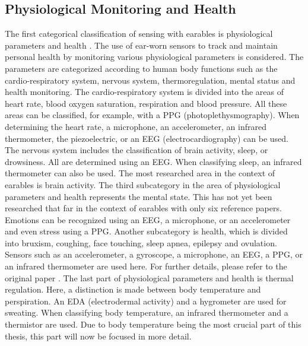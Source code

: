 \subsection{Physiological Monitoring and Health}
\label{Background:SensingWithEarables:Physiological}
The first categorical classification of sensing with earables is physiological parameters and health \cite{roddigerSensingEarablesSystematic2022a}.
The use of ear-worn sensors to track and maintain personal health by monitoring various physiological parameters is considered.
The parameters are categorized according to human body functions such as the cardio-respiratory system, nervous system, thermoregulation, mental status and health monitoring.
The cardio-respiratory system is divided into the areas of heart rate, blood oxygen saturation, respiration and blood pressure.
All these areas can be classified, for example, with a PPG (photoplethysmography). 
When determining the heart rate, a microphone, an accelerometer, an infrared thermometer, the piezoelectric, or an EEG (electrocardiography) can be used.
The nervous system includes the classification of brain activity, sleep, or drowsiness. 
All are determined using an EEG. 
When classifying sleep, an infrared thermometer can also be used. 
The most researched area in the context of earables is brain activity.
The third subcategory in the area of physiological parameters and health represents the mental state.
This has not yet been researched that far in the context of earables with only six reference papers.
Emotions can be recognized using an EEG, a microphone, or an accelerometer and even stress using a PPG.
Another subcategory is health, which is divided into bruxism, coughing, face touching, sleep apnea, epilepsy and ovulation.
Sensors such as an accelerometer, a gyroscope, a microphone, an EEG, a PPG, or an infrared thermometer are used here.
For further details, please refer to the original paper \cite{roddigerSensingEarablesSystematic2022a}.
The last part of physiological parameters and health is thermal regulation. 
Here, a distinction is made between body temperature and perspiration. An EDA (electrodermal activity) and a hygrometer are used for sweating.
When classifying body temperature, an infrared thermometer and a thermistor are used.
Due to body temperature being the most crucial part of this thesis, this part will now be focused in more detail.

